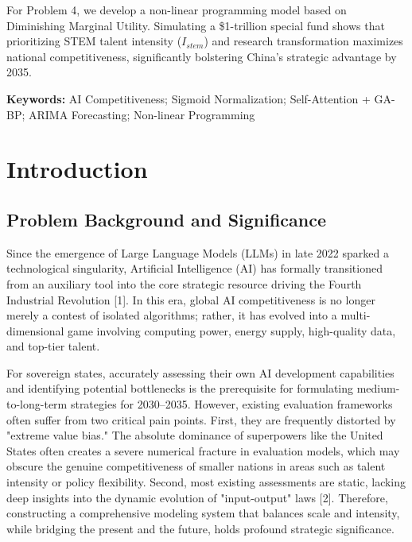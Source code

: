 \documentclass[12pt]{article}
\begin{document}
	For Problem 4, we develop a non-linear programming model based on Diminishing Marginal Utility. Simulating a \$1-trillion special fund shows that prioritizing STEM talent intensity ($I_{stem}$) and research transformation maximizes national competitiveness, significantly bolstering China’s strategic advantage by 2035.
	
	\vspace{1em}
	\noindent \textbf{Keywords:} AI Competitiveness; Sigmoid Normalization; Self-Attention + GA-BP; ARIMA Forecasting; Non-linear Programming
	
	\newpage
	
	\pagestyle{empty}
	\tableofcontents
	\newpage
	
	\pagestyle{plain}
	\setcounter{page}{1} 
	
	\section{Introduction}
	\subsection{Problem Background and Significance}
	Since the emergence of Large Language Models (LLMs) in late 2022 sparked a technological singularity, Artificial Intelligence (AI) has formally transitioned from an auxiliary tool into the core strategic resource driving the Fourth Industrial Revolution [1]. In this era, global AI competitiveness is no longer merely a contest of isolated algorithms; rather, it has evolved into a multi-dimensional game involving computing power, energy supply, high-quality data, and top-tier talent.
	
	For sovereign states, accurately assessing their own AI development capabilities and identifying potential bottlenecks is the prerequisite for formulating medium-to-long-term strategies for 2030–2035. However, existing evaluation frameworks often suffer from two critical pain points. First, they are frequently distorted by "extreme value bias." The absolute dominance of superpowers like the United States often creates a severe numerical fracture in evaluation models, which may obscure the genuine competitiveness of smaller nations in areas such as talent intensity or policy flexibility. Second, most existing assessments are static, lacking deep insights into the dynamic evolution of "input-output" laws [2]. Therefore, constructing a comprehensive modeling system that balances scale and intensity, while bridging the present and the future, holds profound strategic significance.
	
\end{document}
